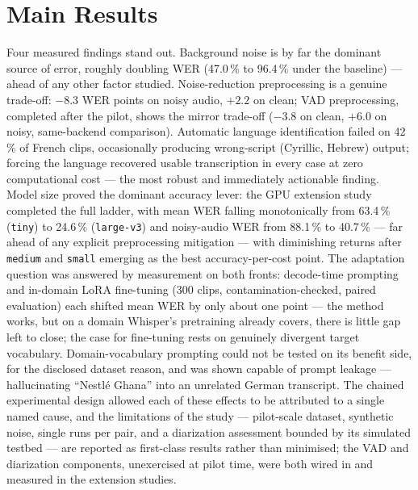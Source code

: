\documentclass[12pt]{report}
\begin{document}
\section*{Main Results}
Four measured findings stand out. Background noise is by far the dominant source of error, roughly doubling WER (47.0\,\% to 96.4\,\% under the baseline) --- ahead of any other factor studied. Noise-reduction preprocessing is a genuine trade-off: $-8.3$ WER points on noisy audio, $+2.2$ on clean; VAD preprocessing, completed after the pilot, shows the mirror trade-off ($-3.8$ on clean, $+6.0$ on noisy, same-backend comparison). Automatic language identification failed on 42\,\% of French clips, occasionally producing wrong-script (Cyrillic, Hebrew) output; forcing the language recovered usable transcription in every case at zero computational cost --- the most robust and immediately actionable finding. Model size proved the dominant accuracy lever: the GPU extension study completed the full ladder, with mean WER falling monotonically from 63.4\,\% (\texttt{tiny}) to 24.6\,\% (\texttt{large-v3}) and noisy-audio WER from 88.1\,\% to 40.7\,\% --- far ahead of any explicit preprocessing mitigation --- with diminishing returns after \texttt{medium} and \texttt{small} emerging as the best accuracy-per-cost point. The adaptation question was answered by measurement on both fronts: decode-time prompting and in-domain LoRA fine-tuning (300 clips, contamination-checked, paired evaluation) each shifted mean WER by only about one point --- the method works, but on a domain Whisper's pretraining already covers, there is little gap left to close; the case for fine-tuning rests on genuinely divergent target vocabulary. Domain-vocabulary prompting could not be tested on its benefit side, for the disclosed dataset reason, and was shown capable of prompt leakage --- hallucinating \enquote{Nestl\'e Ghana} into an unrelated German transcript. The chained experimental design allowed each of these effects to be attributed to a single named cause, and the limitations of the study --- pilot-scale dataset, synthetic noise, single runs per pair, and a diarization assessment bounded by its simulated testbed --- are reported as first-class results rather than minimised; the VAD and diarization components, unexercised at pilot time, were both wired in and measured in the extension studies.
\end{document}
